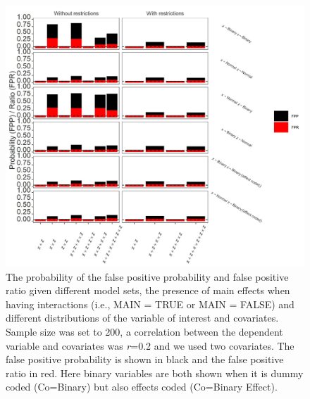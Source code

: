 \begin{figure}[hbt!]
\includegraphics{R/Analysis/Result/Figures/Figure1ASI.jpeg}
\centering
\caption{The probability of the false positive probability and false positive ratio given different model sets, the presence of main effects when having interactions (i.e., MAIN = TRUE or MAIN = FALSE) and different distributions of the variable of interest and covariates. Sample size was set to 200, a correlation between the dependent variable and covariates was \textit{r}=0.2 and we used two covariates. The false positive probability is shown in black and the false positive ratio in red. Here binary variables are both shown when it is dummy coded (Co=Binary) but also effects coded (Co=Binary Effect).}
\label{fig:mainfigure}
\end{figure}


